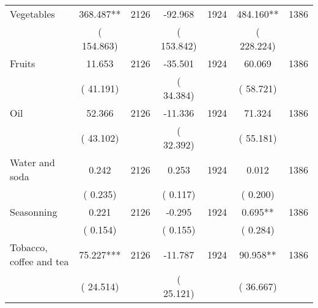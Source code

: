 \begin{tabular}{l*{6}{c}}
Vegetables        &            368.487**      &       2126       &            -92.968      &       1924       &            484.160**      &       1386       \\
                       &       (     154.863)            &                               &       (     153.842)            &                               &       (     228.224)            &                               \\
Fruits        &             11.653      &       2126       &            -35.501      &       1924       &             60.069      &       1386       \\
                       &       (      41.191)            &                               &       (      34.384)            &                               &       (      58.721)            &                               \\
Oil        &             52.366      &       2126       &            -11.336      &       1924       &             71.324      &       1386       \\
                       &       (      43.102)            &                               &       (      32.392)            &                               &       (      55.181)            &                               \\
Water and soda        &              0.242      &       2126       &              0.253      &       1924       &              0.012      &       1386       \\
                       &       (       0.235)            &                               &       (       0.117)            &                               &       (       0.200)            &                               \\
Seasonning        &              0.221      &       2126       &             -0.295      &       1924       &              0.695**      &       1386       \\
                       &       (       0.154)            &                               &       (       0.155)            &                               &       (       0.284)            &                               \\
Tobacco, coffee and tea        &             75.227***      &       2126       &            -11.787      &       1924       &             90.958**      &       1386       \\
                       &       (      24.514)            &                               &       (      25.121)            &                               &       (      36.667)            &                               \\
\hline \end{tabular}